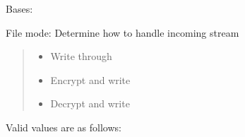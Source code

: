 \documentclass[letterpaper,10pt,english]{sphinxmanual}
\begin{document}
\begin{savenotes}\begin{fulllineitems}
\label{\detokenize{eezz:eezz.filesrv.TFileMode}}
\pysigstartsignatures
{}
\pysigstopsignatures
\sphinxAtStartPar
Bases: 

\sphinxAtStartPar
File mode: Determine how to handle incoming stream
\begin{quote}\begin{description}
\begin{itemize}
\item {} 
\sphinxAtStartPar
{} \textendash{} Write through

\item {} 
\sphinxAtStartPar
{} \textendash{} Encrypt and write

\item {} 
\sphinxAtStartPar
{} \textendash{} Decrypt and write

\end{itemize}

\end{description}\end{quote}

\sphinxAtStartPar
Valid values are as follows:

\begin{savenotes}\begin{fulllineitems}
\label{\detokenize{eezz:eezz.filesrv.TFileMode.NORMAL}}
\pysigstartsignatures
{}
\pysigstopsignatures
\end{fulllineitems}\end{savenotes}


\begin{savenotes}\begin{fulllineitems}
\label{\detokenize{eezz:eezz.filesrv.TFileMode.ENCRYPT}}
\pysigstartsignatures
{}
\pysigstopsignatures
\end{fulllineitems}\end{savenotes}


\end{fulllineitems}
\end{savenotes}
\end{document}
